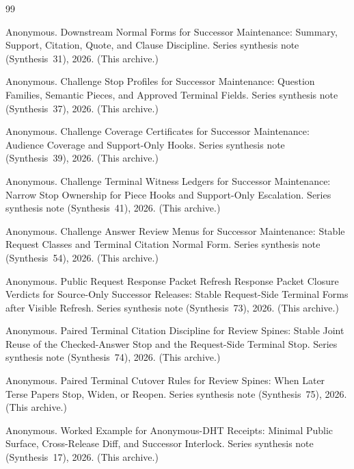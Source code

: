 \documentclass[11pt]{article}
\begin{document}
\begin{thebibliography}{99}\small

Anonymous.
\newblock Downstream Normal Forms for Successor Maintenance: Summary, Support, Citation, Quote, and Clause Discipline.
\newblock Series synthesis note (Synthesis~31), 2026. (This archive.)

Anonymous.
\newblock Challenge Stop Profiles for Successor Maintenance: Question Families, Semantic Pieces, and Approved Terminal Fields.
\newblock Series synthesis note (Synthesis~37), 2026. (This archive.)

Anonymous.
\newblock Challenge Coverage Certificates for Successor Maintenance: Audience Coverage and Support-Only Hooks.
\newblock Series synthesis note (Synthesis~39), 2026. (This archive.)

Anonymous.
\newblock Challenge Terminal Witness Ledgers for Successor Maintenance: Narrow Stop Ownership for Piece Hooks and Support-Only Escalation.
\newblock Series synthesis note (Synthesis~41), 2026. (This archive.)

Anonymous.
\newblock Challenge Answer Review Menus for Successor Maintenance: Stable Request Classes and Terminal Citation Normal Form.
\newblock Series synthesis note (Synthesis~54), 2026. (This archive.)

Anonymous.
\newblock Public Request Response Packet Refresh Response Packet Closure Verdicts for Source-Only Successor Releases: Stable Request-Side Terminal Forms after Visible Refresh.
\newblock Series synthesis note (Synthesis~73), 2026. (This archive.)

Anonymous.
\newblock Paired Terminal Citation Discipline for Review Spines: Stable Joint Reuse of the Checked-Answer Stop and the Request-Side Terminal Stop.
\newblock Series synthesis note (Synthesis~74), 2026. (This archive.)

Anonymous.
\newblock Paired Terminal Cutover Rules for Review Spines: When Later Terse Papers Stop, Widen, or Reopen.
\newblock Series synthesis note (Synthesis~75), 2026. (This archive.)

Anonymous.
\newblock Worked Example for Anonymous-DHT Receipts: Minimal Public Surface, Cross-Release Diff, and Successor Interlock.
\newblock Series synthesis note (Synthesis~17), 2026. (This archive.)

\end{thebibliography}
\end{document}
